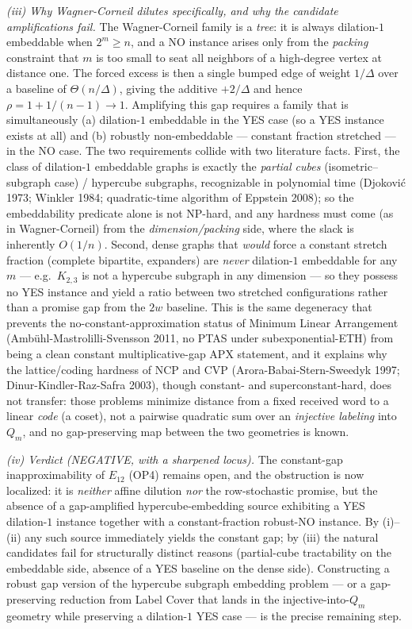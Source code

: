 \documentclass[
]{article}
\begin{document}
\emph{(iii) Why Wagner-Corneil dilutes specifically, and why the
candidate amplifications fail.} The Wagner-Corneil family is a
\emph{tree}: it is always dilation-$1$ embeddable when $2^m \geq n$,
and a NO instance arises only from the \emph{packing} constraint that
$m$ is too small to seat all neighbors of a high-degree vertex at
distance one. The forced excess is then a single bumped edge of weight
$1/\Delta$ over a baseline of $\Theta(n/\Delta)$, giving the additive
$+2/\Delta$ and hence $\rho = 1 + 1/(n-1) \to 1$. Amplifying this gap
requires a family that is simultaneously (a) dilation-$1$ embeddable in
the YES case (so a YES instance exists at all) and (b) robustly
non-embeddable --- constant fraction stretched --- in the NO case. The
two requirements collide with two literature facts. First, the class of
dilation-$1$ embeddable graphs is exactly the \emph{partial cubes}
(isometric--subgraph case) / hypercube subgraphs, recognizable in
polynomial time (Djokovi\'c 1973; Winkler 1984; quadratic-time
algorithm of Eppstein 2008); so the embeddability predicate alone is
not NP-hard, and any hardness must come (as in Wagner-Corneil) from the
\emph{dimension/packing} side, where the slack is inherently
$O(1/n)$. Second, dense graphs that \emph{would} force a constant
stretch fraction (complete bipartite, expanders) are \emph{never}
dilation-$1$ embeddable for any $m$ --- e.g.\ $K_{2,3}$ is not a
hypercube subgraph in any dimension --- so they possess no YES instance
and yield a ratio between two stretched configurations rather than a
promise gap from the $2w$ baseline. This is the same degeneracy that
prevents the no-constant-approximation status of Minimum Linear
Arrangement (Ambühl-Mastrolilli-Svensson 2011, no PTAS under
subexponential-ETH) from being a clean constant multiplicative-gap APX
statement, and it explains why the lattice/coding hardness of NCP and
CVP (Arora-Babai-Stern-Sweedyk 1997; Dinur-Kindler-Raz-Safra 2003),
though constant- and superconstant-hard, does not transfer: those
problems minimize distance from a fixed received word to a linear
\emph{code} (a coset), not a pairwise quadratic sum over an
\emph{injective labeling} into $Q_m$, and no gap-preserving map between
the two geometries is known.

\emph{(iv) Verdict (NEGATIVE, with a sharpened locus).} The
constant-gap inapproximability of $E_{12}$ (OP4) remains open, and the
obstruction is now localized: it is \emph{neither} affine dilution
\emph{nor} the row-stochastic promise, but the absence of a
gap-amplified hypercube-embedding source exhibiting a YES dilation-$1$
instance together with a constant-fraction robust-NO instance. By
(i)--(ii) any such source immediately yields the constant gap; by (iii)
the natural candidates fail for structurally distinct reasons
(partial-cube tractability on the embeddable side, absence of a YES
baseline on the dense side). Constructing a robust gap version of the
hypercube subgraph embedding problem --- or a gap-preserving reduction
from Label Cover that lands in the injective-into-$Q_m$ geometry while
preserving a dilation-$1$ YES case --- is the precise remaining step.
\end{document}
